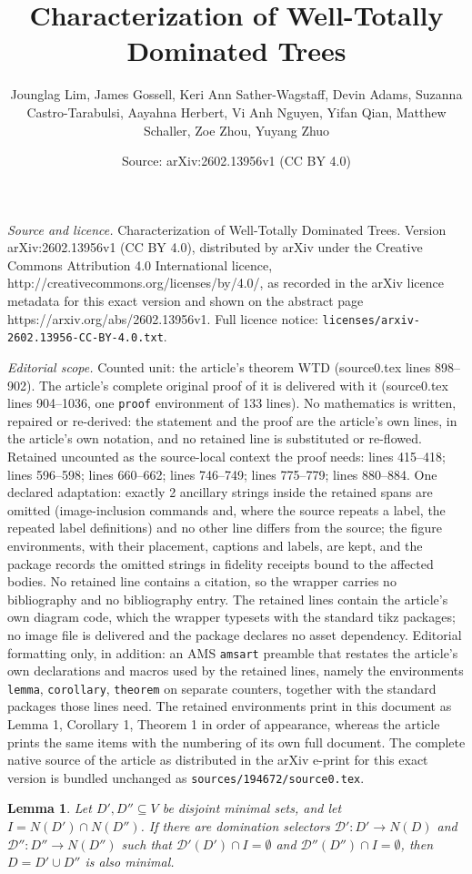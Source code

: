 \documentclass[10pt,a4paper]{amsart}
\title{Characterization of Well-Totally Dominated Trees}
\author{Jounglag Lim, James Gossell, Keri Ann Sather-Wagstaff, Devin Adams, Suzanna Castro-Tarabulsi, Aayahna Herbert, Vi Anh Nguyen, Yifan Qian, Matthew Schaller, Zoe Zhou, Yuyang Zhuo}
\date{Source: arXiv:2602.13956v1 (CC BY 4.0)}
\newtheorem{lemma}{Lemma}
\begin{document}
\maketitle

\noindent\emph{Source and licence.} Characterization of Well-Totally Dominated Trees. Version arXiv:2602.13956v1 (CC BY 4.0), distributed by arXiv under the Creative Commons Attribution 4.0 International licence, http://creativecommons.org/licenses/by/4.0/, as recorded in the arXiv licence metadata for this exact version and shown on the abstract page https://arxiv.org/abs/2602.13956v1. Full licence notice: \texttt{licenses/arxiv-2602.13956-CC-BY-4.0.txt}.\par\smallskip

\noindent\textit{Editorial scope.} Counted unit: the article's theorem WTD (source0.tex lines 898--902). The article's complete original proof of it is delivered with it (source0.tex lines 904--1036, one \texttt{proof} environment of 133 lines). No mathematics is written, repaired or re-derived: the statement and the proof are the article's own lines, in the article's own notation, and no retained line is substituted or re-flowed.  Retained uncounted as the source-local context the proof needs: lines 415--418; lines 596--598; lines 660--662; lines 746--749; lines 775--779; lines 880--884.  One declared adaptation: exactly 2 ancillary strings inside the retained spans are omitted (image-inclusion commands and, where the source repeats a label, the repeated label definitions) and no other line differs from the source; the figure environments, with their placement, captions and labels, are kept, and the package records the omitted strings in fidelity receipts bound to the affected bodies.  No retained line contains a citation, so the wrapper carries no bibliography and no bibliography entry.  The retained lines contain the article's own diagram code, which the wrapper typesets with the standard tikz packages; no image file is delivered and the package declares no asset dependency.  Editorial formatting only, in addition: an AMS \texttt{amsart} preamble that restates the article's own declarations and macros used by the retained lines, namely the environments \texttt{lemma}, \texttt{corollary}, \texttt{theorem} on separate counters, together with the standard packages those lines need.  The retained environments print in this document as Lemma 1, Corollary 1, Theorem 1 in order of appearance, whereas the article prints the same items with the numbering of its own full document.  The complete native source of the article as distributed in the arXiv e-print for this exact version is bundled unchanged as \texttt{sources/194672/source0.tex}.
\begin{lemma}\label{lem. D(v) not in intersection -> union is minimal}
    Let $D', D'' \subseteq V$ be disjoint minimal sets, and let $I = N(D') \cap N(D'')$.
    If there are domination selectors $\mathcal{D}':D' \to N(D)$ and $\mathcal{D}'': D'' \to N(D'')$ such that $\mathcal{D}'(D') \cap I = \emptyset$ and $\mathcal{D}''(D'') \cap I = \emptyset$, then $D = D' \cup D''$ is also minimal.
\end{lemma}
\end{document}
